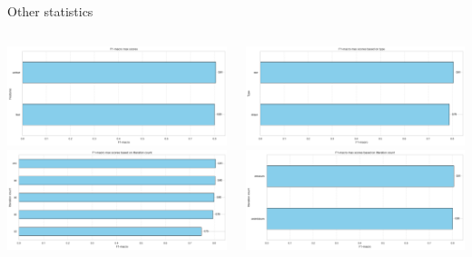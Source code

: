 \begin{frame}{Other statistics}
\begin{columns}

    \begin{column}{0.5\textwidth}
    \includegraphics[width=1\textwidth]{images/f1features.png}
    \includegraphics[width=1\textwidth]{images/f1itterations.png}
    \end{column}
    
    \begin{column}{0.5\textwidth}
    \includegraphics[width=1\textwidth]{images/f1type.png}
    \includegraphics[width=1\textwidth]{images/f1smote.png}
    \end{column}
\end{columns}
\end{frame}

